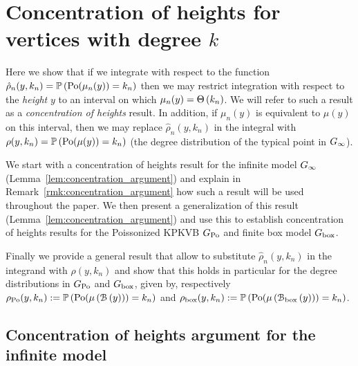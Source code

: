 \section{Concentration of heights for vertices with degree $k$}\label{sec:concentration_argument}

Here we show that if we integrate with respect to the function $\hat{\rho}_n(y,k_n) = \mathbb{P}\left({\mathrm{Po}}(\mu_n(y)) = k_n\right)$ then we may restrict integration with respect to the \emph{height} $y$ to an interval on which $\mu_n(y) = \Theta\left(k_n\right)$. We will refer to such a result as a \emph{concentration of heights} result. In addition, if $\mu_n(y)$ is equivalent to $\mu(y)$ on this interval, then we may replace $\hat{\rho}_n(y,k_n)$ in the integral with $\rho(y,k_n) = \mathbb{P}\left({\mathrm{Po}}(\mu(y)) = k_n\right)$ (the degree distribution of the typical point in $G_{\infty}$). 

We start with a concentration of heights result for the infinite model $G_{\infty}$ (Lemma~\ref{lem:concentration_argument}) and explain in Remark~\ref{rmk:concentration_argument} how such a result will be used throughout the paper. We then present a generalization of this result (Lemma~\ref{lem:concentration_argument}) and use this to establish concentration of heights results for the Poissonized KPKVB $G_{{\mathrm{Po}}}$ and finite box model $G_{\mathrm{box}}$. 

Finally we provide a general result that allow to substitute $\hat{\rho}_n(y,k_n)$ in the integrand with $\rho(y,k_n)$ and show that this holds in particular for the degree distributions in $G_{{\mathrm{Po}}}$ and $G_{\mathrm{box}}$, given by, respectively $\rho_{{\mathrm{Po}}}(y,k_n) := \mathbb{P}\left({\mathrm{Po}}(\mu\left({\mathcal B}\left(y\right)\right)) = k_n\right)$ and $\rho_{\text{box}}(y,k_n) := \mathbb{P}\left({\mathrm{Po}}(\mu\left({\mathcal B}_{\text{box}}\left(y\right)\right)) = k_n\right)$.

\subsection{Concentration of heights argument for the infinite model}

